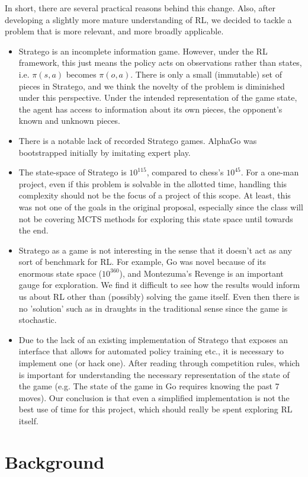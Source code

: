 \documentclass{article}
\begin{document}
In short, there are several practical reasons behind this change. Also, after developing a slightly more mature understanding of RL, we decided to tackle a problem that is more relevant, and more broadly applicable.
\begin{itemize}
	\item Stratego is an incomplete information game. However, under the RL framework, this just means the policy acts on observations rather than states, i.e. $\pi(s,a)$ becomes $\pi(o,a)$. There is only a small (immutable) set of pieces in Stratego, and we think the novelty of the problem is diminished under this perspective. Under the intended representation of the game state, the agent has access to information about its own pieces, the opponent's known and unknown pieces.
	\item There is a notable lack of recorded Stratego games. AlphaGo was bootstrapped initially by imitating expert play.
	\item The state-space of Stratego is $10^{115}$, compared to chess's $10^{45}$. For a one-man project, even if this problem is solvable in the allotted time, handling this complexity should not be the focus of a project of this scope. At least, this was not one of the goals in the original proposal, especially since the class will not be covering MCTS methods for exploring this state space until towards the end.
	\item Stratego as a game is not interesting in the sense that it doesn't act as any sort of benchmark for RL. For example, Go was novel because of its enormous state space ($10^{360}$), and Montezuma's Revenge is an important gauge for exploration. We find it difficult to see how the results would inform us about RL other than (possibly) solving the game itself. Even then there is no 'solution' such as in draughts in the traditional sense since the game is stochastic.
	\item Due to the lack of an existing implementation of Stratego that exposes an interface that allows for automated policy training etc., it is necessary to implement one (or hack one). After reading through competition rules, which is important for understanding the necessary representation of the state of the game (e.g. The state of the game in Go requires knowing the past 7 moves). Our conclusion is that even a simplified implementation is not the best use of time for this project, which should really be spent exploring RL itself.
\end{itemize}

\section{Background}
\end{document}
